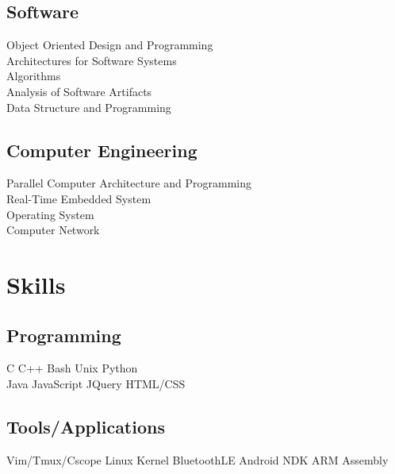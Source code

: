 \documentclass[letterpaper]{deedy-resume} %
\begin{document}
\begin{minipage}[t]{0.35\textwidth}
\subsection{Software}
Object Oriented Design and Programming \\
Architectures for Software Systems \\
Algorithms \\
Analysis of Software Artifacts \\
Data Structure and Programming \\

\sectionspace
\subsection{Computer Engineering}
Parallel Computer Architecture and Programming \\
Real-Time Embedded System \\
Operating System \\
Computer Network \\

\sectionspace


\section{Skills}

\subsection{Programming}
C \textbullet{} C++ \textbullet{} Bash \textbullet{}
Unix \textbullet{} Python \\
Java \textbullet{} JavaScript \textbullet{}
JQuery \textbullet{} HTML/CSS \\
\sectionspace

\subsection{Tools/Applications}
Vim/Tmux/Cscope \textbullet{} Linux Kernel \textbullet{}
BluetoothLE \textbullet{} Android NDK \textbullet{}
ARM \textbullet{} Assembly \\


\end{minipage}
\end{document}
